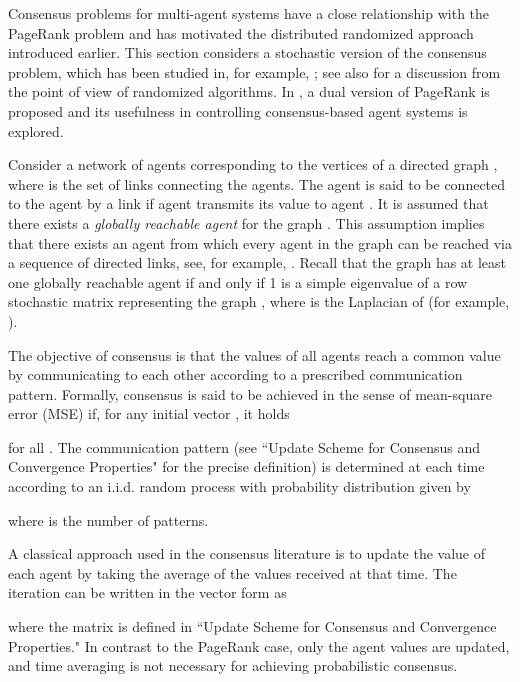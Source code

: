 \documentclass[11pt,draftcls,onecolumn]{IEEEtran}
\begin{document}
Consensus problems for multi-agent systems have a close relationship with
the PageRank problem and has motivated the distributed randomized approach 
introduced earlier. 
This section considers 
a stochastic version 
of the consensus problem, which has been studied
in, for example, \cite{BoyGhoPra:06,HatMes:05,TahJad:08,Wu:06};
see also \cite{TemIsh:07} for a discussion from the point of view of 
randomized algorithms. 
In \cite{TsuYam:08}, a dual version of PageRank is proposed and
its usefulness in controlling consensus-based agent systems is 
explored.

Consider a  network of  agents corresponding to the vertices  
of a directed graph , where 
is the set of links connecting the agents. The agent  is said to be connected 
to the agent  by a link  if agent  transmits its 
value to agent . It is assumed that there exists a {\it globally reachable agent} 
for the  graph . This assumption implies that there exists an agent from which
every agent in the graph can be reached via a sequence of directed links, see, for example, 
\cite{BulCorMar:09,LinFraMag:05,RenBea:05}. Recall that the graph 
 has at least one globally reachable agent if and only if 1 is 
a simple eigenvalue of a row stochastic matrix representing the graph , 
where  is the Laplacian of  (for example, \cite{BulCorMar:09}).

The objective of consensus is that the values 
 of all agents reach a common value 
by communicating to each other according to a prescribed communication pattern. 
Formally, consensus is said to be achieved in the sense of mean-square error (MSE) if, 
for any initial vector , it holds

for all .
The communication pattern (see ``Update Scheme for Consensus and Convergence Properties" 
for the precise definition) 
is determined at each time  according to an i.i.d. random process
 with probability distribution given by 

where  is the number of patterns.


A classical approach used in the consensus literature is to update the value of each agent
by taking the average of the values received at that time.
The iteration can be written in the vector form as

where the matrix  is defined in
``Update Scheme for Consensus and Convergence Properties." 
In contrast to the PageRank case, only the agent values  are updated,
and time averaging is not necessary for achieving probabilistic consensus.

\vspace{.5cm}
\end{document}
